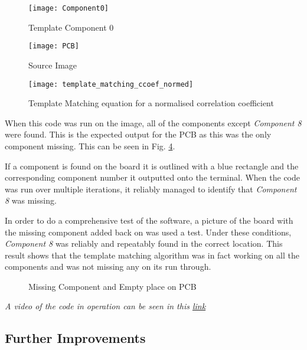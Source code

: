 \documentclass[conference]{IEEEtran}
\begin{document}
\begin{figure}[h]
\centerline{\texttt{[image: Component0]}}
\caption{Template Component 0}
\label{fig:Component0}
\end{figure}

\begin{figure}[h]
\centerline{\texttt{[image: PCB]}}
\caption{Source Image }
\label{fig:PCB}
\end{figure}

\begin{figure}[H]
\centerline{\texttt{[image: template\_matching\_ccoef\_normed]}}
\caption{Template Matching equation for a normalised correlation coefficient}
\label{fig:template_matching_ccoef_normed}
\end{figure}

When this code was run on the image, all of the components except \textit{Component 8} were found. This is the expected output for the PCB as this was the only component missing. This can be seen in Fig. \ref{fig:Missing_component_and_empty_place_on_PCB}.

If a component is found on the board it is outlined with a blue rectangle and the corresponding component number it outputted onto the terminal. When the code was run over multiple iterations, it reliably managed to identify that \textit{Component 8} was missing. 

In order to do a comprehensive test of the software, a picture of the board with the missing component added back on was used a test. Under these conditions, \textit{Component 8} was reliably and repeatably found in the correct location. This result shows that the template matching algorithm was in fact working on all the components and was not missing any on its run through. 

\begin{figure}
\centering
{}
\caption{Missing Component and Empty place on PCB}
\label{fig:Missing_component_and_empty_place_on_PCB}
\end{figure} 

\textit{A video of the code in operation can be seen in this \href{https://youtu.be/8uITJsA60Wk}{link}}

\subsection{Further Improvements}
\end{document}
